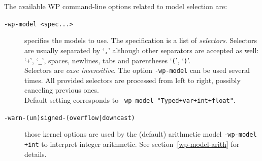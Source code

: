 The available \textsf{WP} command-line options related to model selection are:
\begin{description}
\item[\tt -wp-model <spec...>] specifies the models to use. The
  specification is a list of \emph{selectors}. Selectors are usually
  separated by `\verb|,|' although other separators are accepted as well:
  `\verb|+|', `\verb|_|', spaces, newlines, tabs and parentheses `\verb|(|',
  `\verb|)|'.\\ Selectors are \emph{case insensitive}. The option
  \texttt{-wp-model} can be used several times. All provided selectors
  are processed from left to right, possibly canceling previous ones.\\
  Default setting corresponds to \texttt{-wp-model "Typed+var+int+float"}.

\item[\tt -warn-(un)signed-(overflow|downcast)] those kernel options are
  used by the (default) arithmetic model \texttt{-wp-model +int} to interpret integer
  arithmetic. See section~\ref{wp-model-arith} for details.


\end{description}
